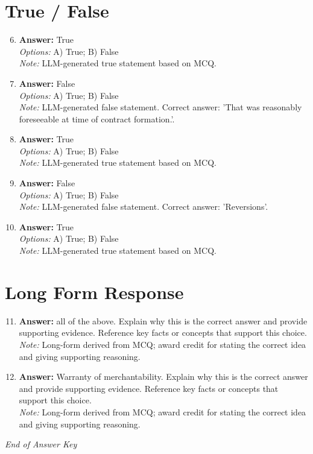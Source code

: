 \documentclass[12pt]{article}
\begin{document}
\section*{True / False}
\begin{enumerate}[label=\arabic*.]
\setcounter{enumi}{5}
\item \textbf{Answer:} True
\\ \textit{Options:} A) True; B) False
\\ \textit{Note:} LLM-generated true statement based on MCQ.
\item \textbf{Answer:} False
\\ \textit{Options:} A) True; B) False
\\ \textit{Note:} LLM-generated false statement. Correct answer: 'That was reasonably foreseeable at time of contract formation.'.
\item \textbf{Answer:} True
\\ \textit{Options:} A) True; B) False
\\ \textit{Note:} LLM-generated true statement based on MCQ.
\item \textbf{Answer:} False
\\ \textit{Options:} A) True; B) False
\\ \textit{Note:} LLM-generated false statement. Correct answer: 'Reversions'.
\item \textbf{Answer:} True
\\ \textit{Options:} A) True; B) False
\\ \textit{Note:} LLM-generated true statement based on MCQ.
\end{enumerate}

\section*{Long Form Response}
\begin{enumerate}[label=\arabic*.]
\setcounter{enumi}{10}
\item \textbf{Answer:} all of the above. Explain why this is the correct answer and provide supporting evidence. Reference key facts or concepts that support this choice.
\\ \textit{Note:} Long-form derived from MCQ; award credit for stating the correct idea and giving supporting reasoning.
\item \textbf{Answer:} Warranty of merchantability. Explain why this is the correct answer and provide supporting evidence. Reference key facts or concepts that support this choice.
\\ \textit{Note:} Long-form derived from MCQ; award credit for stating the correct idea and giving supporting reasoning.
\end{enumerate}

\vfill
\noindent\textit{End of Answer Key}
\end{document}
